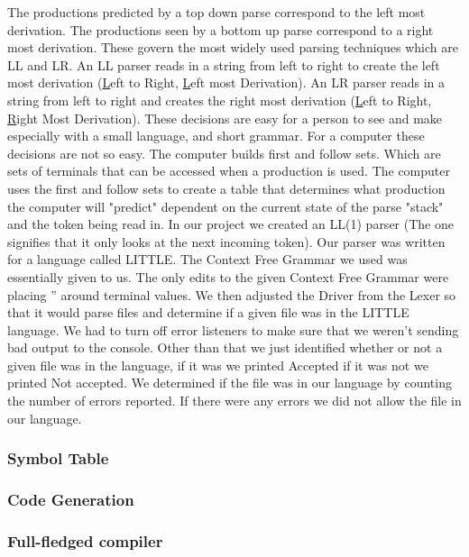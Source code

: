 \documentclass[sigconf]{acmart}
\begin{document}
\newline
The productions predicted by a top down parse correspond to the left most derivation. The productions seen by a bottom up parse correspond to a right most derivation. These govern the most widely used parsing techniques which are LL and LR. An LL parser reads in a string from left to right to create the left most derivation (\underline{L}eft to Right, \underline{L}eft most Derivation). An LR parser reads in a string from left to right and creates the right most derivation (\underline{L}eft to Right, \underline{R}ight Most Derivation).
\newline
These decisions are easy for a person to see and make especially with a small language, and short grammar. For a computer these decisions are not so easy. The computer builds first and follow sets. Which are sets of terminals that can be accessed when a production is used. The computer uses the first and follow sets to create a table that determines what production the computer will "predict" dependent on the current state of the parse "stack" and the token being read in. 
\newline
 In our project we created an LL(1) parser (The one signifies that it only looks at the next incoming token). Our parser was written for a language called LITTLE. The Context Free Grammar we used was essentially given to us. The only edits to the given Context Free Grammar were placing '' around terminal values. We then adjusted the Driver from the Lexer so that it would parse files and determine if a given file was in the LITTLE language. We had to turn off error listeners to make sure that we weren't sending bad output to the console. Other than that we just identified whether or not a given file was in the language, if it was we printed Accepted if it was not we printed Not accepted. We determined if the file was in our language by counting the number of errors reported. If there were any errors we did not allow the file in our language. 
\newline
  

\subsubsection{Symbol Table} 
\subsubsection{Code Generation} 
\subsubsection{Full-fledged compiler}
\end{document}
